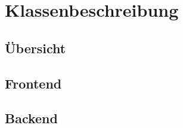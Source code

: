 \section{Klassenbeschreibung}
\subsection{Übersicht}
\subsection{Frontend}



\subsection{Backend}

